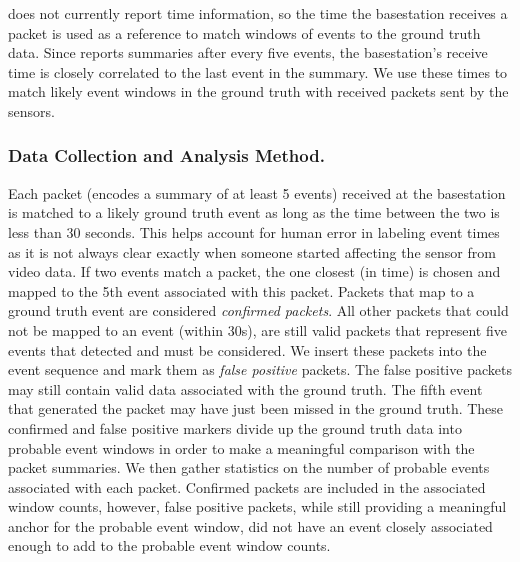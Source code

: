 \sysname does not currently report time information, so the time the basestation receives a packet is used as a reference to match windows of events to the ground truth data.
Since \sysname reports summaries after every five events, the basestation's receive time is closely correlated to the last event in the summary.
We use these times to match likely event windows in the ground truth with received packets sent by the \sysname sensors.

\subsubsection{Data Collection and Analysis Method.}
Each packet (encodes a summary of at least 5 events) received at the basestation is matched to a likely ground truth event as long as the time between the two is less than 30 seconds.  
This helps account for human error in labeling event times as it is not always clear exactly when someone started affecting the sensor from video data.
If two events match a packet, the one closest (in time) is chosen and mapped to the 5th event associated with this packet.
Packets that map to a ground truth event are considered \textit{confirmed packets}.
All other packets that could not be mapped to an event (within 30s), are still valid packets that represent five events that \sysname detected and must be considered. 
We insert these packets into the event sequence and mark them as \textit{false positive} packets.
The false positive packets may still contain valid data associated with the ground truth.
The fifth event that generated the packet may have just been missed in the ground truth. 
These confirmed and false positive markers divide up the ground truth data into probable event windows in order to make a meaningful comparison with the packet summaries.
We then gather statistics on the number of probable events associated with each packet. 
Confirmed packets are included in the associated window counts, however, false positive packets, while still providing a meaningful anchor for the probable event window, did not have an event closely associated enough to add to the probable event window counts.  

